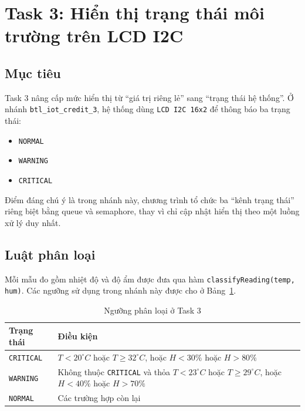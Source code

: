 \documentclass[12pt,a4paper]{article}
\begin{document}
\section{Task 3: Hiển thị trạng thái môi trường trên LCD I2C}

\subsection{Mục tiêu}

Task 3 nâng cấp mức hiển thị từ ``giá trị riêng lẻ'' sang ``trạng thái hệ thống''. Ở nhánh \texttt{btl\_iot\_credit\_3}, hệ thống dùng \texttt{LCD I2C 16x2} để thông báo ba trạng thái:
\begin{itemize}
  \item \texttt{NORMAL}
  \item \texttt{WARNING}
  \item \texttt{CRITICAL}
\end{itemize}

Điểm đáng chú ý là trong nhánh này, chương trình tổ chức ba ``kênh trạng thái'' riêng biệt bằng queue và semaphore, thay vì chỉ cập nhật hiển thị theo một luồng xử lý duy nhất.

\subsection{Luật phân loại}

Mỗi mẫu đo gồm nhiệt độ và độ ẩm được đưa qua hàm \texttt{classifyReading(temp, hum)}. Các ngưỡng sử dụng trong nhánh này được cho ở Bảng~\ref{tab:task3-thresholds}.

\begin{table}[H]
\centering
\caption{Ngưỡng phân loại ở Task 3}
\label{tab:task3-thresholds}
\begin{tabular}{>{\raggedright\arraybackslash}p{} >{\raggedright\arraybackslash}p{}}
\toprule
\textbf{Trạng thái} & \textbf{Điều kiện} \\
\midrule
\texttt{CRITICAL} & $T < 20^\circ C$ hoặc $T \geq 32^\circ C$, hoặc $H < 30\%$ hoặc $H > 80\%$ \\
\texttt{WARNING} & Không thuộc \texttt{CRITICAL} và thỏa $T < 23^\circ C$ hoặc $T \geq 29^\circ C$, hoặc $H < 40\%$ hoặc $H > 70\%$ \\
\texttt{NORMAL} & Các trường hợp còn lại \\
\bottomrule
\end{tabular}
\end{table}
\end{document}
